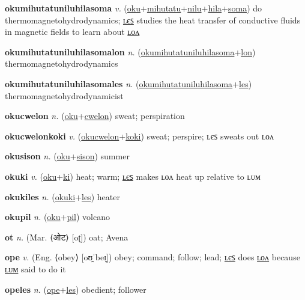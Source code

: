 \textbf{\hypertarget{okumihutatuniluhilasoma}{okumihutatuniluhilasoma}} \textit{v.} (\hyperlink{oku}{oku}+\allowbreak \hyperlink{mihutatu}{mihutatu}+\allowbreak \hyperlink{nilu}{nilu}+\allowbreak \hyperlink{hila}{hila}+\allowbreak \hyperlink{soma}{soma})
do thermomagnetohydrodynamics; \hyperlink{okumihutatuniluhilasomales}{ʟєꜱ} studies the heat transfer of conductive fluids in magnetic fields to learn about \hyperlink{okumihutatuniluhilasomalon}{ʟᴏᴧ}

\textbf{\hypertarget{okumihutatuniluhilasomalon}{okumihutatuniluhilasomalon}} \textit{n.} (\hyperlink{okumihutatuniluhilasoma}{okumihutatuniluhilasoma}+\allowbreak \hyperlink{lon}{lon})
thermomagnetohydrodynamics

\textbf{\hypertarget{okumihutatuniluhilasomales}{okumihutatuniluhilasomales}} \textit{n.} (\hyperlink{okumihutatuniluhilasoma}{okumihutatuniluhilasoma}+\allowbreak \hyperlink{les}{les})
thermomagnetohydrodynamicist

\textbf{\hypertarget{okucwelon}{okucwelon}} \textit{n.} (\hyperlink{oku}{oku}+\allowbreak \hyperlink{cwelon}{cwelon})
sweat; perspiration

\textbf{\hypertarget{okucwelonkoki}{okucwelonkoki}} \textit{v.} (\hyperlink{okucwelon}{okucwelon}+\allowbreak \hyperlink{koki}{koki})
sweat; perspire; ʟєꜱ sweats out ʟᴏᴧ

\textbf{\hypertarget{okusison}{okusison}} \textit{n.} (\hyperlink{oku}{oku}+\allowbreak \hyperlink{sison}{sison})
summer

\textbf{\hypertarget{okuki}{okuki}} \textit{v.} (\hyperlink{oku}{oku}+\allowbreak \hyperlink{ki}{ki})
heat; warm; \hyperlink{okukiles}{ʟєꜱ} makes ʟᴏᴧ heat up relative to ʟᴜᴍ

\textbf{\hypertarget{okukiles}{okukiles}} \textit{n.} (\hyperlink{okuki}{okuki}+\allowbreak \hyperlink{les}{les})
heater

\textbf{\hypertarget{okupil}{okupil}} \textit{n.} (\hyperlink{oku}{oku}+\allowbreak \hyperlink{pil}{pil})
volcano

\textbf{\hypertarget{ot}{ot}} \textit{n.} (Mar. ⟨{\devanagari{}ओट}⟩ [oʈ])
oat; Avena

\textbf{\hypertarget{ope}{ope}} \textit{v.} (Eng. ⟨obey⟩ [oʊ̯ˈbeɪ̯])
obey; command; follow; lead; \hyperlink{opeles}{ʟєꜱ} does \hyperlink{opelon}{ʟᴏᴧ} because \hyperlink{opelum}{ʟᴜᴍ} said to do it

\textbf{\hypertarget{opeles}{opeles}} \textit{n.} (\hyperlink{ope}{ope}+\allowbreak \hyperlink{les}{les})
obedient; follower

